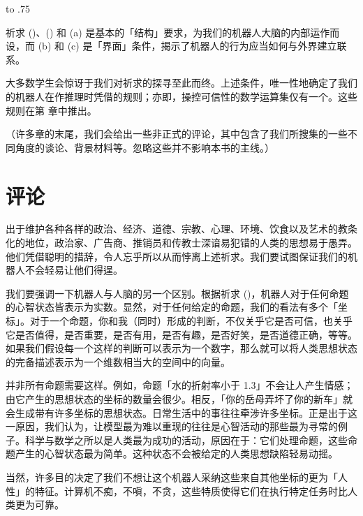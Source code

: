 \placeformula[desiderata-3c]
\startformula
{}\quad\quad\hbox to .75
\stopformula
\stopsubformulas

祈求 ()、() 和 (a) 是基本的「结构」要求，为我们的机器人大脑的内部运作而设，而 (b) 和 (c) 是「界面」条件，揭示了机器人的行为应当如何与外界建立联系。

大多数学生会惊讶于我们对祈求的探寻至此而终。上述条件，唯一性地确定了我们的机器人在作推理时凭借的规则；亦即，操控可信性的数学运算集仅有一个。这些规则在第  章中推出。

（许多章的末尾，我们会给出一些非正式的评论，其中包含了我们所搜集的一些不同角度的谈论、背景材料等。忽略这些并不影响本书的主线。）

\section{评论}

出于维护各种各样的政治、经济、道德、宗教、心理、环境、饮食以及艺术的教条化的地位，政治家、广告商、推销员和传教士深谙易犯错的人类的思想易于愚弄。他们凭借聪明的措辞，令人忘乎所以从而悖离上述祈求。我们要试图保证我们的机器人不会轻易让他们得逞。

我们要强调一下机器人与人脑的另一个区别。根据祈求 ()，机器人对于任何命题的心智状态皆表示为实数。显然，对于任何给定的命题，我们的看法有多个「坐标」。对于一个命题，你和我（同时）形成的判断，不仅关乎它是否可信，也关乎它是否值得，是否重要，是否有用，是否有趣，是否好笑，是否道德正确，等等。如果我们假设每一个这样的判断可以表示为一个数字，那么就可以将人类思想状态的完备描述表示为一个维数相当大的空间中的向量。

并非所有命题需要这样。例如，命题「水的折射率小于 1.3」不会让人产生情感；由它产生的思想状态的坐标的数量会很少。相反，「你的岳母弄坏了你的新车」就会生成带有许多坐标的思想状态。日常生活中的事往往牵涉许多坐标。正是出于这一原因，我们认为，让模型最为难以重现的往往是心智活动的那些最为寻常的例子。科学与数学之所以是人类最为成功的活动，原因在于：它们处理命题，这些命题产生的心智状态最为简单。这种状态不会被给定的人类思想缺陷轻易动摇。

当然，许多目的决定了我们不想让这个机器人采纳这些来自其他坐标的更为「人性」的特征。计算机不痴，不嗔，不贪，这些特质使得它们在执行特定任务时比人类更为可靠。

